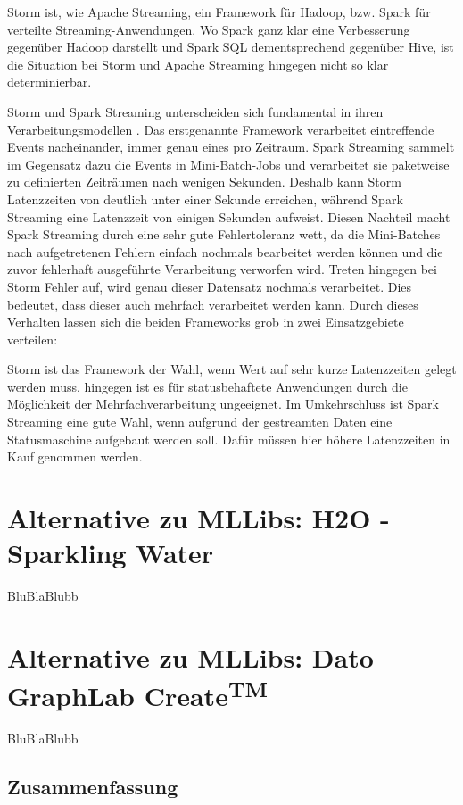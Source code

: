 Storm ist, wie Apache Streaming, ein Framework für Hadoop, bzw. Spark für verteilte Streaming-Anwendungen. Wo Spark ganz klar eine Verbesserung gegenüber Hadoop darstellt und Spark SQL dementsprechend gegenüber Hive, ist die Situation bei Storm und Apache Streaming hingegen nicht so klar determinierbar. 

Storm und Spark Streaming unterscheiden sich fundamental in ihren Verarbeitungsmodellen . Das erstgenannte Framework verarbeitet eintreffende Events nacheinander, immer genau eines pro Zeitraum. Spark Streaming sammelt im Gegensatz dazu die Events in Mini-Batch-Jobs und verarbeitet sie paketweise zu definierten Zeiträumen nach wenigen Sekunden. Deshalb kann Storm Latenzzeiten von deutlich unter einer Sekunde erreichen, während Spark Streaming eine Latenzzeit von einigen Sekunden aufweist. Diesen Nachteil macht Spark Streaming durch eine sehr gute Fehlertoleranz wett, da die Mini-Batches nach aufgetretenen Fehlern einfach nochmals bearbeitet werden können und die zuvor fehlerhaft ausgeführte Verarbeitung verworfen wird. Treten hingegen bei Storm Fehler auf, wird genau dieser Datensatz nochmals verarbeitet. Dies bedeutet, dass dieser auch mehrfach verarbeitet werden kann. Durch dieses Verhalten lassen sich die beiden Frameworks grob in zwei Einsatzgebiete verteilen:

Storm ist das Framework der Wahl, wenn Wert auf sehr kurze Latenzzeiten gelegt werden muss, hingegen ist es für statusbehaftete Anwendungen durch die Möglichkeit der Mehrfachverarbeitung ungeeignet. Im Umkehrschluss ist Spark Streaming eine gute Wahl, wenn aufgrund der gestreamten Daten eine Statusmaschine aufgebaut werden soll. Dafür müssen hier höhere Latenzzeiten in Kauf genommen werden.     

\section{Alternative zu MLLibs: H2O - Sparkling Water}
\label{section:h20}


BluBlaBlubb


\section{Alternative zu MLLibs: Dato GraphLab Create\textsuperscript{TM}}
\label{section:h20}


BluBlaBlubb



\subsection{Zusammenfassung}
\label{section:storm}




